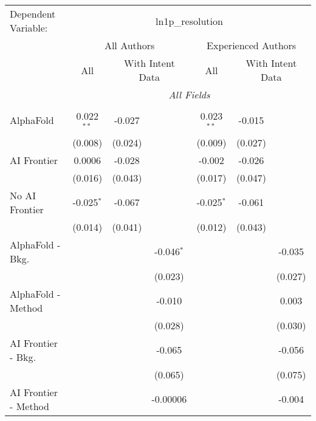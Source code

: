 \begingroup
\centering
\begin{tabular}{lcccccc}
   \tabularnewline \midrule \midrule
   Dependent Variable: & \multicolumn{6}{c}{ln1p\_resolution}\\
 & \multicolumn{3}{c}{All Authors} & \multicolumn{3}{c}{Experienced Authors} \\
\cmidrule(lr){2-4} \cmidrule(lr){5-7}
 & \multicolumn{1}{c}{All} & \multicolumn{2}{c}{With Intent Data} & \multicolumn{1}{c}{All} & \multicolumn{2}{c}{With Intent Data} \\
\cmidrule(lr){2-2} \cmidrule(lr){3-4} \cmidrule(lr){5-5} \cmidrule(lr){6-7}
 & \multicolumn{6}{c}{\textit{All Fields}} \\ \\
   AlphaFold               & 0.022$^{**}$ & -0.027  &              & 0.023$^{**}$ & -0.015  &   \\   
                           & (0.008)      & (0.024) &              & (0.009)      & (0.027) &   \\   
   AI Frontier             & 0.0006       & -0.028  &              & -0.002       & -0.026  &   \\   
                           & (0.016)      & (0.043) &              & (0.017)      & (0.047) &   \\   
   No AI Frontier          & -0.025$^{*}$ & -0.067  &              & -0.025$^{*}$ & -0.061  &   \\   
                           & (0.014)      & (0.041) &              & (0.012)      & (0.043) &   \\   
   AlphaFold - Bkg.        &              &         & -0.046$^{*}$ &              &         & -0.035\\   
                           &              &         & (0.023)      &              &         & (0.027)\\   
   AlphaFold - Method      &              &         & -0.010       &              &         & 0.003\\   
                           &              &         & (0.028)      &              &         & (0.030)\\   
   AI Frontier - Bkg.      &              &         & -0.065       &              &         & -0.056\\   
                           &              &         & (0.065)      &              &         & (0.075)\\   
   AI Frontier - Method    &              &         & -0.00006     &              &         & -0.004\\   

\end{tabular}
